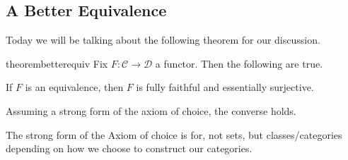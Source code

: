 
\subsection{A Better Equivalence}

Today we will be talking about the following theorem for our discussion.
\begin{restatable}{theorem}{betterequiv} \label{thm:betterequiv}
	Fix $F:\mathcal C\to\mathcal D$ a functor. Then the following are true.
	\begin{listalph}
		\item If $F$ is an equivalence, then $F$ is fully faithful and essentially surjective.
		\item Assuming a strong form of the axiom of choice, the converse holds.
	\end{listalph}
\end{restatable}
\begin{remark}
	The strong form of the Axiom of choice is for, not sets, but classes/categories depending on how we choose to construct our categories.
\end{remark}
